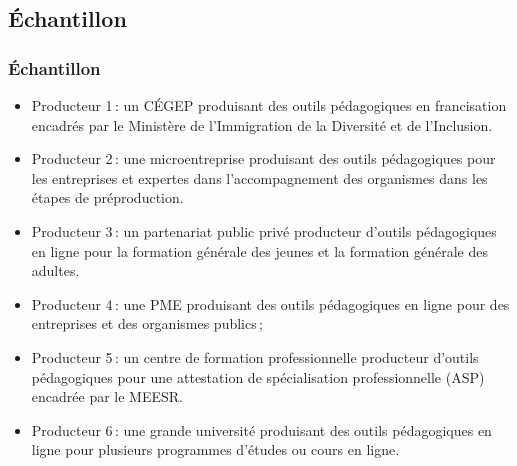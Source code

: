                        		 \subsection{Échantillon} 
					\begin{frame}[allowframebreaks]
						\frametitle{Échantillon}
                        
                        			\begin{itemize} 
                       				\item Producteur 1\,: un CÉGEP produisant des outils pédagogiques en francisation encadrés par le Ministère de l’Immigration de la Diversité et de l'Inclusion.
                       				\item Producteur 2\,: une microentreprise produisant des outils pédagogiques pour les entreprises et expertes dans l’accompagnement des organismes dans les étapes de préproduction.
							\item Producteur 3\,: un partenariat public privé producteur d’outils pédagogiques en ligne pour la formation générale des jeunes et la formation générale des adultes.
							\item Producteur 4\,: une PME produisant des outils pédagogiques en ligne pour des entreprises et des organismes publics\,;
							\item Producteur 5\,: un centre de formation professionnelle producteur d’outils pédagogiques pour une attestation de spécialisation professionnelle (ASP) encadrée par le MEESR.
							\item Producteur 6\,: une grande université produisant des outils pédagogiques en ligne pour plusieurs programmes d’études ou cours en ligne.

                       		 \end{itemize}
                       		           
                \end{frame}
                       		 
